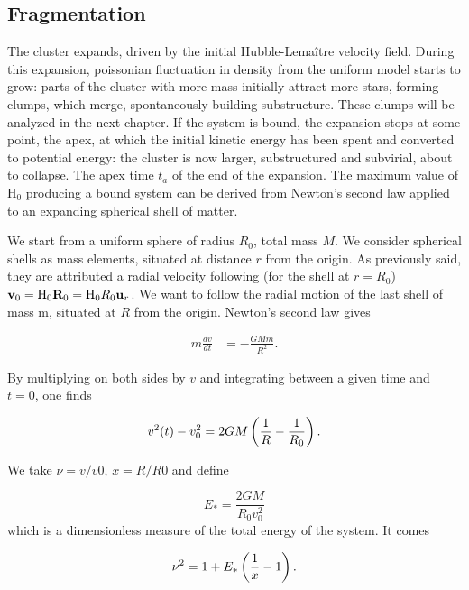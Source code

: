 \subsection{Fragmentation}
\label{Sec:1_apextime}

The cluster expands, driven by the initial Hubble-Lema\^itre velocity field. During this expansion, poissonian fluctuation in density from the uniform model starts to grow: parts of the cluster with more mass initially attract more stars, forming clumps, which merge, spontaneously building substructure. These clumps will be analyzed in the next chapter. If the system is bound, the expansion stops at some point, the apex, at which the initial kinetic energy has been spent and converted to potential energy: the cluster is now larger, substructured and subvirial, about to collapse. The apex time $t_a$ of the end of the expansion. The maximum value of H$_0$ producing a bound system can be derived from Newton's second law applied to an expanding spherical shell of matter.

We start from a uniform sphere of radius $R_0$, total mass $M$. We consider spherical shells as mass elements, situated at distance $r$ from the origin. As previously said, they are attributed a radial velocity following (for the shell at $r=R_0$) $\bold v_0 = {\textrm{H}}_0 \bold R_0 = {\textrm{H}}_0 R_0 \bold u_r$. We want to follow the radial motion of the last shell of mass m, situated at $R$ from the origin. Newton's second law gives


\begin{align}\label{eq:newton}
m \frac{dv}{dt} & = - \frac{G M m}{R^2}.
\end{align}

By multiplying on both sides by $v$ and integrating between a given time and $t=0$, one finds

\begin{equation}
v^2(t) - v^2_0 = 2GM \left( \frac{1}{R} - \frac{1}{R_0} \right).
\end{equation}

We take $\nu = v/v0$,  $x= R/R0$ and define

\begin{equation}
\label{Eq:1_Estar}
E_\ast = \frac{2GM}{R_0 v_0^2}
\end{equation}
which is a dimensionless measure of the total energy of the system. It comes

\begin{equation}
\nu^2  = 1 + E_\ast \left( \frac{1}{x} - 1 \right).
\end{equation}

